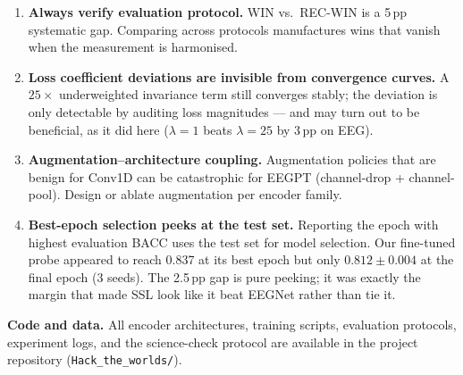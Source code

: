 \documentclass[11pt,a4paper]{article}
\begin{document}
\begin{enumerate}[noitemsep]
  \item \textbf{Always verify evaluation protocol.}
    WIN vs.\ REC-WIN is a 5\,pp systematic gap.  Comparing across protocols manufactures
    wins that vanish when the measurement is harmonised.
  \item \textbf{Loss coefficient deviations are invisible from convergence curves.}
    A $25{\times}$ underweighted invariance term still converges stably; the deviation
    is only detectable by auditing loss magnitudes --- and may turn out to be beneficial,
    as it did here ($\lambda{=}1$ beats $\lambda{=}25$ by 3\,pp on EEG).
  \item \textbf{Augmentation--architecture coupling.}
    Augmentation policies that are benign for Conv1D can be catastrophic for EEGPT
    (channel-drop + channel-pool).  Design or ablate augmentation per encoder family.
  \item \textbf{Best-epoch selection peeks at the test set.}
    Reporting the epoch with highest evaluation BACC uses the test set for model selection.
    Our fine-tuned probe appeared to reach 0.837 at its best epoch but only $0.812\pm0.004$
    at the final epoch (3 seeds).  The 2.5\,pp gap is pure peeking; it was exactly the margin
    that made SSL look like it beat EEGNet rather than tie it.
\end{enumerate}

\bigskip
\noindent\textbf{Code and data.}
All encoder architectures, training scripts, evaluation protocols, experiment logs,
and the science-check protocol are available in the project repository
(\texttt{Hack\_the\_worlds/}).



\end{document}
